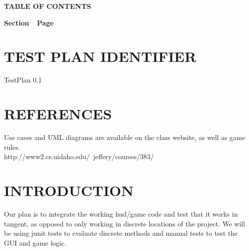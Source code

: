 {\centering{}\bfseries\color{black}
TABLE OF CONTENTS
\par}

{\bfseries\color{black}
Section\ \ Page}

\setcounter{tocdepth}{9}
\renewcommand\contentsname{}
\tableofcontents

\bigskip

\bigskip
\setcounter{page}{1}\pagestyle{Convertiv}

\section[IDENTIFIER]{\bfseries\color{black}
TEST PLAN IDENTIFIER}

{\color{black}
TestPlan 0.1\\}


\section[REFERENCES]{\bfseries\color{black}
REFERENCES}

{\color{black}
Use cases and UML diagrams are available on the class website, as well as game rules.\\
http://www2.cs.uidaho.edu/~jeffery/courses/383/ \\
}

\section[INTRODUCTION]{\bfseries\color{black} INTRODUCTION}

{\color{black}
Our plan is to integrate the working hud/game code and test that it works in tangent, as opposed to only working in discrete locations of the project. We will be using junit tests to evaluate discrete methods and manual tests to test the GUI and game logic.
}

